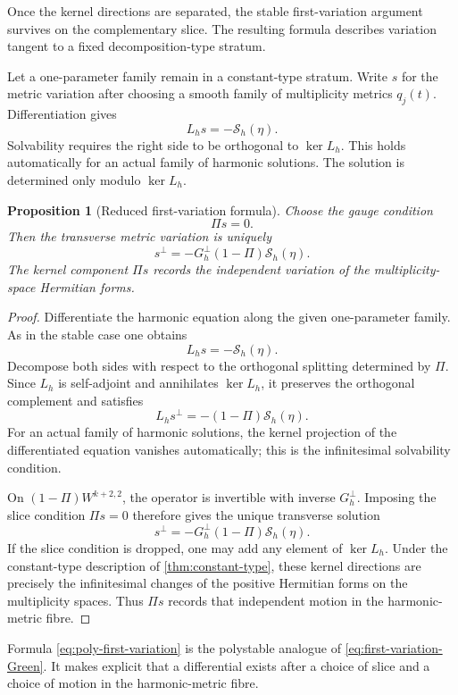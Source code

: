 \documentclass[11pt,reqno]{amsart}
\newtheorem{proposition}[theorem]{Proposition}
\theoremstyle{definition}
\theoremstyle{remark}
\newcommand{\cS}{\mathcal S}
\begin{document}
Once the kernel directions are separated, the stable first-variation argument survives on the complementary slice.  The resulting formula describes variation tangent to a fixed decomposition-type stratum.


Let a one-parameter family remain in a constant-type stratum.  Write $s$ for the metric variation after choosing a smooth family of multiplicity metrics $q_j(t)$.  Differentiation gives
\[
  L_hs=-\cS_h(\eta).
\]
Solvability requires the right side to be orthogonal to $\ker L_h$.  This holds automatically for an actual family of harmonic solutions.  The solution is determined only modulo $\ker L_h$.

\begin{proposition}[Reduced first-variation formula]\label{prop:reduced-first-variation}
Choose the gauge condition
\[
  \Pi s=0.
\]
Then the transverse metric variation is uniquely
\begin{equation}\label{eq:poly-first-variation}
  s^\perp=-G_h^\perp(1-\Pi)\cS_h(\eta).
\end{equation}
The kernel component $\Pi s$ records the independent variation of the multiplicity-space Hermitian forms.
\end{proposition}

\begin{proof}
Differentiate the harmonic equation along the given one-parameter family.  As in the stable case one obtains
\[
  L_hs=-\cS_h(\eta).
\]
Decompose both sides with respect to the orthogonal splitting determined by $\Pi$.  Since $L_h$ is self-adjoint and annihilates $\ker L_h$, it preserves the orthogonal complement and satisfies
\[
  L_hs^\perp=-(1-\Pi)\cS_h(\eta).
\]
For an actual family of harmonic solutions, the kernel projection of the differentiated equation vanishes automatically; this is the infinitesimal solvability condition.

On $(1-\Pi)W^{k+2,2}$, the operator is invertible with inverse $G_h^\perp$.  Imposing the slice condition $\Pi s=0$ therefore gives the unique transverse solution
\[
  s^\perp=-G_h^\perp(1-\Pi)\cS_h(\eta).
\]
If the slice condition is dropped, one may add any element of $\ker L_h$.  Under the constant-type description of \cref{thm:constant-type}, these kernel directions are precisely the infinitesimal changes of the positive Hermitian forms on the multiplicity spaces.  Thus $\Pi s$ records that independent motion in the harmonic-metric fibre.
\end{proof}

Formula \eqref{eq:poly-first-variation} is the polystable analogue of \eqref{eq:first-variation-Green}.  It makes explicit that a differential exists after a choice of slice and a choice of motion in the harmonic-metric fibre.
\end{document}
